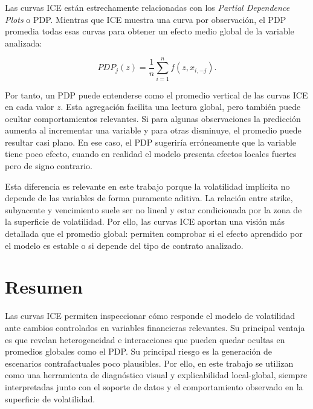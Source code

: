 Las curvas ICE están estrechamente relacionadas con los \emph{Partial Dependence Plots} o PDP. Mientras que ICE muestra una curva por observación, el PDP promedia todas esas curvas para obtener un efecto medio global de la variable analizada:

\begin{equation}
PDP_j(z)=\frac{1}{n}\sum_{i=1}^{n} f(z,x_{i,-j}).
\label{eq:pdp}
\end{equation}

Por tanto, un PDP puede entenderse como el promedio vertical de las curvas ICE en cada valor \(z\). Esta agregación facilita una lectura global, pero también puede ocultar comportamientos relevantes. Si para algunas observaciones la predicción aumenta al incrementar una variable y para otras disminuye, el promedio puede resultar casi plano. En ese caso, el PDP sugeriría erróneamente que la variable tiene poco efecto, cuando en realidad el modelo presenta efectos locales fuertes pero de signo contrario.

Esta diferencia es relevante en este trabajo porque la volatilidad implícita no depende de las variables de forma puramente aditiva. La relación entre strike, subyacente y vencimiento suele ser no lineal y estar condicionada por la zona de la superficie de volatilidad. Por ello, las curvas ICE aportan una visión más detallada que el promedio global: permiten comprobar si el efecto aprendido por el modelo es estable o si depende del tipo de contrato analizado.

\section*{Resumen}
Las curvas ICE permiten inspeccionar cómo responde el modelo de volatilidad ante cambios controlados en variables financieras relevantes. Su principal ventaja es que revelan heterogeneidad e interacciones que pueden quedar ocultas en promedios globales como el PDP. Su principal riesgo es la generación de escenarios contrafactuales poco plausibles. Por ello, en este trabajo se utilizan como una herramienta de diagnóstico visual y explicabilidad local-global, siempre interpretadas junto con el soporte de datos y el comportamiento observado en la superficie de volatilidad.
